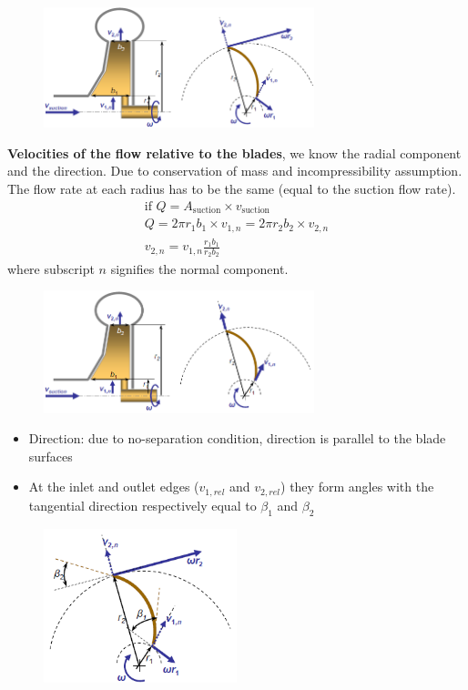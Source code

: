 \documentclass[class=report, crop=false, 12pt,a4paper]{standalone}
\begin{document}
\begin{figure}[H]
  \centering
  \includegraphics[width = 0.7\textwidth]{../img/diagram5.png}
\end{figure}
\textbf{Velocities of the flow relative to the blades}, we know the radial component and the direction. Due to conservation of mass and incompressibility assumption. The flow rate at each radius has to be the same (equal to the suction flow rate).
\begin{gather}
  \textrm{if } Q = A_{\textrm{suction}} \times v_{\textrm{suction}}\\
  Q = 2 \pi r_1 b_1 \times v_{1, n} = 2\pi r_2 b_2 \times v_{2, n}\\
  v_{2, n} = v_{1, n} \frac{r_1 b_1}{r_2 b_2}
\end{gather}
where subscript $n$ signifies the normal component.
\begin{figure}[H]
  \centering
  \includegraphics[width = 0.7\textwidth]{../img/diagram6.png}
\end{figure}
\begin{itemize}
  \item Direction: due to no-separation condition, direction is parallel to the blade surfaces
  \item At the inlet and outlet edges ($v_{1, rel}$ and $v_{2, rel}$) they form angles with the tangential direction respectively equal to $\beta_1$ and $\beta_2$
\end{itemize}
\begin{figure}[H]
  \centering
  \includegraphics[width = 0.5\textwidth]{../img/diagram7.png}
\end{figure}
\end{document}
